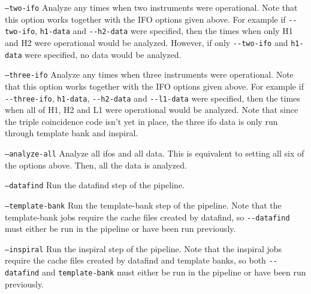 \begin{entry}
\begin{entry}
\item[\texttt{--two-ifo}] Analyze any times when two instruments were
operational.  Note that this option works together with the IFO options given
above.  For example if \verb$--two-ifo$, \verb$h1-data$ and \verb$--h2-data$
were specified, then the times when only H1 and H2 were operational would be
analyzed.  However, if only \verb$--two-ifo$ and \verb$h1-data$ were
specified, no data would be analyzed.
\end{entry}

\begin{entry}
\item[\texttt{--three-ifo}] Analyze any times when three instruments were
operational.  Note that this option works together with the IFO options given
above.  For example if \verb$--three-ifo$, \verb$h1-data$, \verb$--h2-data$
and \verb$--l1-data$ were specified, then the times when all of H1, H2 and L1
were operational would be analyzed.  Note that since the triple coincidence
code isn't yet in place, the three ifo data is only run through template bank
and inspiral.
\end{entry}

\begin{entry}
\item[\texttt{--analyze-all}] Analyze all ifos and all data.  This is
equivalent to setting all six of the options above.  Then, all the data is
analyzed.
\end{entry}

\begin{entry}
\item[\texttt{--datafind}] Run the datafind step of the pipeline.
\end{entry}

\begin{entry}
\item[\texttt{--template-bank}] Run the template-bank step of the pipeline.
Note that the template-bank jobs require the cache files created by datafind,
so \verb$--datafind$ must either be run in the pipeline or have been run
previously.
\end{entry}

\begin{entry}
\item[\texttt{--inspiral}] Run the inspiral step of the pipeline.  Note that
the inspiral jobs require the cache files created by datafind and template
banks, so both \verb$--datafind$ and \verb$template-bank$ must either be run
in the pipeline or have been run previously.
\end{entry}


\end{entry}
